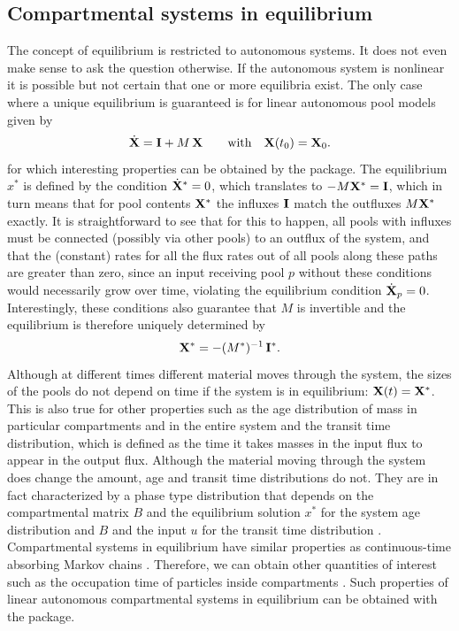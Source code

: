 \subsection{Compartmental systems in equilibrium} \label{sec:Equilibrium}
The concept of equilibrium is restricted to autonomous systems. 
It does not even make sense to ask the question otherwise.  
If the autonomous system is nonlinear it is possible but not certain that one or more
equilibria exist. The only case where a unique equilibrium is guaranteed is for
linear autonomous pool models given by
\begin{equation} \label{eq:LS}
\dot{\mathbf{X}} = \mathbf{I} + M \, \mathbf{X} \qquad  \mathrm{with} \quad \mathbf{X}(t_0) = \mathbf{X}_0.
\end{equation}
for which interesting properties can be
obtained by the \LAPM{} package.  The equilibrium $x^\ast$ is defined by the
condition  $\dot{\mathbf{X}}^\ast=0$, which translates to $-M \mathbf{X}^\ast= \mathbf{I}$, which in turn means that for
pool contents $\mathbf{X}^\ast$ the influxes $\mathbf{I}$ match the outfluxes $M \mathbf{X}^\ast$ exactly.  It is
straightforward to see that for this to happen, all 
pools with influxes must be connected (possibly via other pools) to an outflux of
the system, and that the (constant) rates for all the flux rates out of all
pools along these paths are greater than zero, since an input receiving pool $p$
without these conditions would necessarily grow over time, violating the
equilibrium condition $\dot{\mathbf{X}}_p=0$. Interestingly, these conditions also
guarantee that $M$ is invertible and the equilibrium is therefore uniquely
determined by 
\begin{equation} 
\label{eq:x_Minv_I}
\mathbf{X}^* = - ({M^\ast})^{-1} \, \mathbf{I}^\ast.  
\end{equation}
Although at different times different material moves through the system, the
sizes of the pools do not depend on time if the system is in
equilibrium: $\mathbf{X}(t)=\mathbf{X}^\ast$. 
This is also true for other properties such as the
age distribution of mass in particular compartments and in the entire system
and the transit time distribution, which is defined as the time it takes masses
in the input flux to appear in the output flux. 
Although the material moving through the system does change the amount, age and transit
time distributions do not. 
They are in fact characterized by a phase type
distribution that depends on the compartmental matrix $B$ and the equilibrium
solution $x^\ast$ for the system age distribution and $B$ and the input $u$
for the transit time distribution \citep{Metzler2018MGS}. 
Compartmental systems in equilibrium have similar properties as continuous-time absorbing Markov chains \citep{Metzler2018MGS}.
Therefore, we can obtain other quantities of interest such as the occupation time of particles inside compartments \cite{Metzler2020}. Such properties of linear autonomous compartmental systems in equilibrium can be obtained with the \LAPM{} package.

